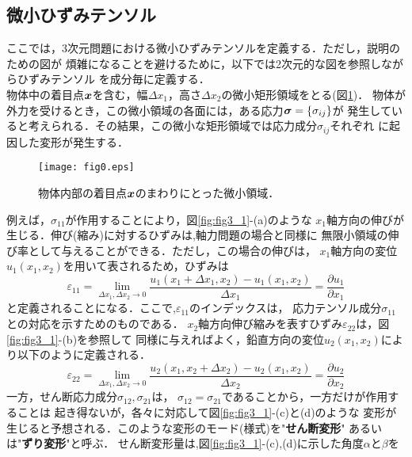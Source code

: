 \documentclass[10pt,a4j]{jbook}
\begin{document}
\subsection{微小ひずみテンソル}
ここでは，3次元問題における微小ひずみテンソルを定義する．ただし，説明のための図が
煩雑になることを避けるために，以下では2次元的な図を参照しながらひずみテンソル
を成分毎に定義する．\\

物体中の着目点$\mbox{\boldmath $x$}$を含む，幅$\Delta x_1$，高さ$\Delta x_2$の微小矩形領域をとる(図\ref{fig:fig0})．
物体が外力を受けるとき，この微小領域の各面には，ある応力$\mbox{\boldmath $\sigma$}=\{\sigma_{ij}\}$が
発生していると考えられる．その結果，この微小な矩形領域では応力成分$\sigma_{ij}$それぞれ
に起因した変形が発生する．
\begin{figure}[h]
	\begin{center}
	\texttt{[image: fig0.eps]} 
	\end{center}
	\caption{物体内部の着目点$\mbox{\boldmath $x$}$のまわりにとった微小領域．} 
	\label{fig:fig0}
\end{figure}
例えば，$\sigma_{11}$が作用することにより，図\ref{fig:fig3_1}-(a)のような
$x_1$軸方向の伸びが生じる．伸び(縮み)に対するひずみは,軸力問題の場合と同様に
無限小領域の伸び率として与えることができる．ただし，この場合の伸びは，
$x_1$軸方向の変位$u_1(x_1,x_2)$を用いて表されるため，ひずみは
\begin{equation}
	\varepsilon_{11}=\lim_{\Delta x_1,\Delta x_2 \rightarrow 0}
	\frac{u_1(x_1+\Delta x_1,x_2)-u_1(x_1,x_2)}{\Delta x_1}
	=\frac{\partial u_1}{\partial x_1}
	\label{eqn:def_e11}
\end{equation}
と定義されることになる．ここで,$\varepsilon_{11}$のインデックスは，
応力テンソル成分$\sigma_{11}$との対応を示すためのものである．
$x_2$軸方向伸び縮みを表すひずみ$\varepsilon_{22}$は，図\ref{fig:fig3_1}-(b)を参照して
同様に与えればよく，鉛直方向の変位$u_2(x_1,x_2)$により以下のように定義される．
\begin{equation}
	\varepsilon_{22}=\lim_{\Delta x_1,\Delta x_2 \rightarrow 0}
	\frac{u_2(x_1,x_2+\Delta x_2)-u_2(x_1,x_2)}{\Delta x_2}
	=\frac{\partial u_2}{\partial x_2}
	\label{eqn:def_e22}
\end{equation}
一方，せん断応力成分$\sigma_{12}, \sigma_{21}$は，
$\sigma_{12}=\sigma_{21}$であることから，一方だけが作用することは
起き得ないが，各々に対応して図\ref{fig:fig3_1}-(c)と(d)のような
変形が生じると予想される．このような変形のモード(様式)を"{\bf せん断変形}"
あるいは"{\bf ずり変形}"と呼ぶ．
せん断変形量は,図\ref{fig:fig3_1}-(c),(d)に示した角度$\alpha$と$\beta$を
\end{document}
